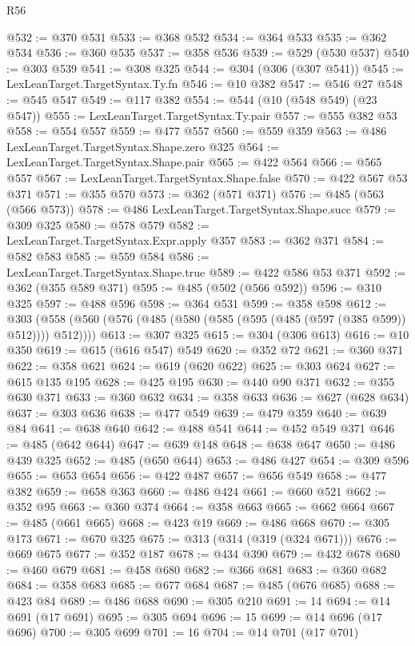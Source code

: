 \begin{lexlean}{R56}
\begin{coremodule}
@532 := @370 @531
@533 := @368 @532
@534 := @364 @533
@535 := @362 @534
@536 := @360 @535
@537 := @358 @536
@539 := @529 (@530 @537)
@540 := @303 @539
@541 := @308 @325
@544 := @304 (@306 (@307 @541))
@545 := LexLeanTarget.TargetSyntax.Ty.fn
@546 := @10 @382
@547 := @546 @27
@548 := @545 @547
@549 := @117 @382
@554 := @544 (@10 (@548 @549) (@23 @547))
@555 := LexLeanTarget.TargetSyntax.Ty.pair
@557 := @555 @382 @53
@558 := @554 @557
@559 := @477 @557
@560 := @559 @359
@563 := @486 LexLeanTarget.TargetSyntax.Shape.zero @325
@564 := LexLeanTarget.TargetSyntax.Shape.pair
@565 := @422 @564
@566 := @565 @557
@567 := LexLeanTarget.TargetSyntax.Shape.false
@570 := @422 @567 @53 @371
@571 := @355 @570
@573 := @362 (@571 @371)
@576 := @485 (@563 (@566 @573))
@578 := @486 LexLeanTarget.TargetSyntax.Shape.succ
@579 := @309 @325
@580 := @578 @579
@582 := LexLeanTarget.TargetSyntax.Expr.apply @357
@583 := @362 @371
@584 := @582 @583
@585 := @559 @584
@586 := LexLeanTarget.TargetSyntax.Shape.true
@589 := @422 @586 @53 @371
@592 := @362 (@355 @589 @371)
@595 := @485 (@502 (@566 @592))
@596 := @310 @325
@597 := @488 @596
@598 := @364 @531
@599 := @358 @598
@612 := @303 (@558 (@560 (@576 (@485 (@580 (@585 (@595 (@485 (@597 (@385 @599)) @512)))) @512))))
@613 := @307 @325
@615 := @304 (@306 @613)
@616 := @10 @350
@619 := @615 (@616 @547) @549
@620 := @352 @72
@621 := @360 @371
@622 := @358 @621
@624 := @619 (@620 @622)
@625 := @303 @624
@627 := @615 @135 @195
@628 := @425 @195
@630 := @440 @90 @371
@632 := @355 @630 @371
@633 := @360 @632
@634 := @358 @633
@636 := @627 (@628 @634)
@637 := @303 @636
@638 := @477 @549
@639 := @479 @359
@640 := @639 @84
@641 := @638 @640
@642 := @488 @541
@644 := @452 @549 @371
@646 := @485 (@642 @644)
@647 := @639 @148
@648 := @638 @647
@650 := @486 @439 @325
@652 := @485 (@650 @644)
@653 := @486 @427
@654 := @309 @596
@655 := @653 @654
@656 := @422 @487
@657 := @656 @549
@658 := @477 @382
@659 := @658 @363
@660 := @486 @424
@661 := @660 @521
@662 := @352 @95
@663 := @360 @374
@664 := @358 @663
@665 := @662 @664
@667 := @485 (@661 @665)
@668 := @423 @19
@669 := @486 @668
@670 := @305 @173
@671 := @670 @325
@675 := @313 (@314 (@319 (@324 @671)))
@676 := @669 @675
@677 := @352 @187
@678 := @434 @390
@679 := @432 @678
@680 := @460 @679
@681 := @458 @680
@682 := @366 @681
@683 := @360 @682
@684 := @358 @683
@685 := @677 @684
@687 := @485 (@676 @685)
@688 := @423 @84
@689 := @486 @688
@690 := @305 @210
@691 := 14
@694 := @14 @691 (@17 @691)
@695 := @305 @694
@696 := 15
@699 := @14 @696 (@17 @696)
@700 := @305 @699
@701 := 16
@704 := @14 @701 (@17 @701)

\end{coremodule}
\end{lexlean}
